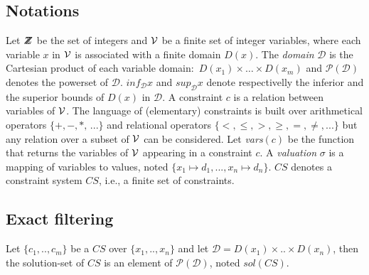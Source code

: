 \documentclass[submission,copyright,creativecommons]{eptcs}
\newcommand{\Z}{Z\hspace{-.6em}Z}
\begin{document}
\subsection{Notations}
Let $\Z$ be the set of integers and $\cal V$ be a finite set of integer variables, where each variable $x$ in $\cal V$ is
associated with a finite domain $D(x)$. The {\it domain} 
$\mathcal{D}$ is the Cartesian product of each variable domain:~$D(x_1) \times \ldots \times D(x_m)$ and
$\mathcal{P(D)}$ denotes the powerset of $\mathcal{D}$. $inf_{\mathcal{D}} x$ and $sup_{\mathcal{D}} x$ denote
respectivelly the inferior and the superior bounds of $D(x)$ in $\mathcal{D}$.
A constraint $c$ is
a relation between variables of $\cal V$. The language of (elementary) constraints is built over arithmetical
operators $\{+,-,*,\,...\}$ and relational operators $\{<,\leq,>,\geq, =, \neq, ...\}$ but any relation over a subset
of $\cal V$ can be considered. Let {\it vars}$(c)$ be the function that returns the variables of $\cal V$ 
appearing in a constraint $c$. A {\it valuation} $\sigma$
is a mapping of variables to values, noted $\{x_1 \mapsto d_1, ...,x_n \mapsto d_n \}$. $CS$ denotes a constraint system $CS$, i.e., 
a finite set of constraints.

\subsection{Exact filtering}

Let $\{c_1,..,c_m\}$ be a $CS$ over $\{x_1,..,x_n\}$ and let $\mathcal{D} = D(x_1) \times .. \times D(x_n)$, then
the solution-set of $CS$ is an element of $\mathcal{P(D)}$, noted $sol(CS)$.
\end{document}
